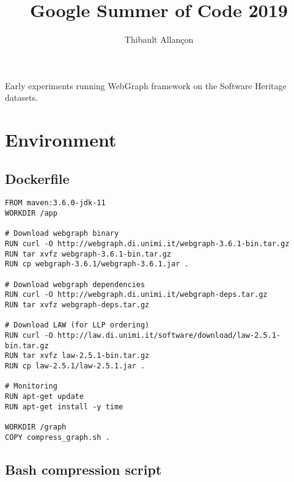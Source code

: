\documentclass[11pt,a4paper]{article}
\title{Google Summer of Code 2019}
\author{Thibault Allançon}
\date{}
\begin{document}
\maketitle

Early experiments running WebGraph framework on the Software Heritage datasets.

\section{Environment}

\subsection{Dockerfile}

\begin{small}
\begin{verbatim}
FROM maven:3.6.0-jdk-11
WORKDIR /app

# Download webgraph binary
RUN curl -O http://webgraph.di.unimi.it/webgraph-3.6.1-bin.tar.gz
RUN tar xvfz webgraph-3.6.1-bin.tar.gz
RUN cp webgraph-3.6.1/webgraph-3.6.1.jar .

# Download webgraph dependencies
RUN curl -O http://webgraph.di.unimi.it/webgraph-deps.tar.gz
RUN tar xvfz webgraph-deps.tar.gz

# Download LAW (for LLP ordering)
RUN curl -O http://law.di.unimi.it/software/download/law-2.5.1-bin.tar.gz
RUN tar xvfz law-2.5.1-bin.tar.gz
RUN cp law-2.5.1/law-2.5.1.jar .

# Monitoring
RUN apt-get update
RUN apt-get install -y time

WORKDIR /graph
COPY compress_graph.sh .
\end{verbatim}
\end{small}

\subsection{Bash compression script}
\end{document}
